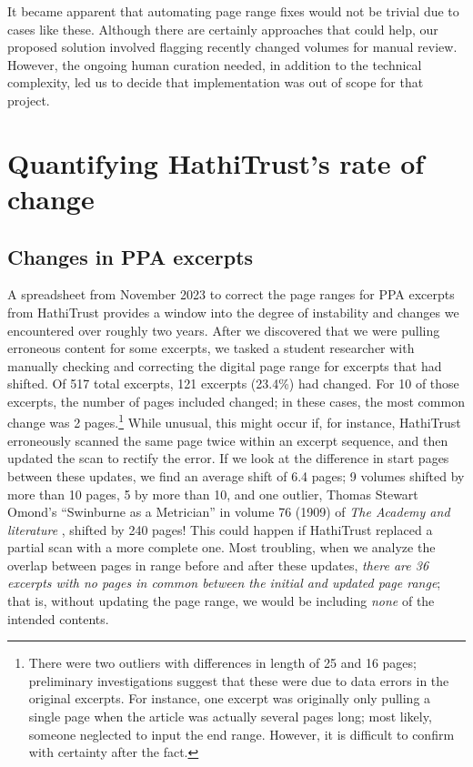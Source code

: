 \documentclass{anthology-ch}         %
\begin{document}
It became apparent that automating page range fixes would not be trivial due to cases like these. Although there are certainly approaches that could help, our proposed solution involved flagging recently changed volumes for manual review. However, the ongoing human curation needed, in addition to the technical complexity, led us to decide that implementation was out of scope for that project.

\section{Quantifying HathiTrust’s rate of change}

\subsection{Changes in PPA excerpts}

A spreadsheet from November 2023 to correct the page ranges for PPA excerpts from HathiTrust provides a window into the degree of instability and changes we encountered over roughly two years. After we discovered that we were pulling erroneous content for some excerpts, we tasked a student researcher with manually checking and correcting the digital page range for excerpts that had shifted. Of 517 total excerpts, 121 excerpts (23.4\%) had changed. For 10 of those excerpts, the number of pages included changed; in these cases, the most common change was 2 pages.\footnote{There were two outliers with differences in length of 25 and 16 pages; preliminary investigations suggest that these were due to data errors in the original excerpts. For instance, one excerpt was originally only pulling a single page when the article was actually several pages long; most likely, someone neglected to input the end range. However, it is difficult to confirm with certainty after the fact.} While unusual, this might occur if, for instance, HathiTrust erroneously scanned the same page twice within an excerpt sequence, and then updated the scan to rectify the error. If we look at the difference in start pages between these updates, we find an average shift of 6.4 pages; 9 volumes shifted by more than 10 pages, 5 by more than 10, and one outlier, Thomas Stewart Omond’s “Swinburne as a Metrician” in volume 76 (1909) of \textit{The Academy and literature} \cite{omond_thomas_stewart_swinburne_1909}, shifted by 240 pages! This could happen if HathiTrust replaced a partial scan with a more complete one. Most troubling, when we analyze the overlap between pages in range before and after these updates, \textit{there are 36 excerpts with no pages in common between the initial and updated page range}; that is, without updating the page range, we would be including \textit{none} of the intended contents.
\end{document}

